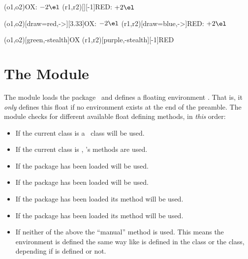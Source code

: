 \documentclass{chemmacros-manual}
\begin{document}
\begin{example}
  \vspace{7mm}
  \redox(o1,o2){\small OX: $- 2\el$}
  \redox(r1,r2)[][-1]{\small RED: $+ 2\el$}
  \vspace{7mm}
\end{example}

\begin{example}
  \vspace{14mm}
  \redox(o1,o2)[draw=red,->][3.33]{\small OX: $- 2\el$}
  \redox(r1,r2)[draw=blue,->]{\small RED: $+ 2\el$}
\end{example}

\begin{example}
  \vspace{7mm}
  \redox(o1,o2)[green,-stealth]{\small OX}
  \redox(r1,r2)[purple,-stealth][-1]{\small RED}
  \vspace{7mm}
\end{example}

\section{The  Module}\label{sec:scheme-module}

The  module loads the 
package~\cite{pkg:chemnum} and defines a floating environment
.  That is, it \emph{only} defines this float if no
environment  exists at the end of the preamble.  The module checks
for different available float defining methods, in \emph{this} order:
\begin{itemize}
  \item If the current class is a \KOMAScript\ class  will
    be used.
  \item If the current class is , 's methods are used.
  \item If the package  has been loaded  will
    be used.
  \item If the package  has been loaded
     will be used.
  \item {}If the package  has been loaded its
    method will be used.
  \item If the package  has been loaded its method will be used.
  \item If neither of the above the \enquote{manual} method is used.  This
    means the environment is defined the same way like  is
    defined in the  class or the  class, depending if
     is defined or not.
\end{itemize}
\end{document}
